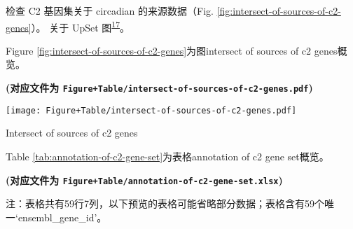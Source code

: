 \documentclass[
]{article}
\begin{document}
检查 C2 基因集关于 circadian 的来源数据（Fig. \ref{fig:intersect-of-sources-of-c2-genes}）。
关于 UpSet 图\textsuperscript{\protect\hyperlink{ref-SetsAndIntersLexA2014}{17}}。

Figure \ref{fig:intersect-of-sources-of-c2-genes}为图intersect of sources of c2 genes概览。

\textbf{(对应文件为 \texttt{Figure+Table/intersect-of-sources-of-c2-genes.pdf})}

\def\@captype{figure}
\begin{center}
\texttt{[image: Figure+Table/intersect-of-sources-of-c2-genes.pdf]}
\caption{Intersect of sources of c2 genes}\label{fig:intersect-of-sources-of-c2-genes}
\end{center}

Table \ref{tab:annotation-of-c2-gene-set}为表格annotation of c2 gene set概览。

\textbf{(对应文件为 \texttt{Figure+Table/annotation-of-c2-gene-set.xlsx})}

\begin{center}\begin{tcolorbox}[colback=gray!10, colframe=gray!50, width=0.9\linewidth, arc=1mm, boxrule=0.5pt]注：表格共有59行7列，以下预览的表格可能省略部分数据；表格含有59个唯一`ensembl\_gene\_id'。
\end{tcolorbox}
\end{center}
\end{document}
